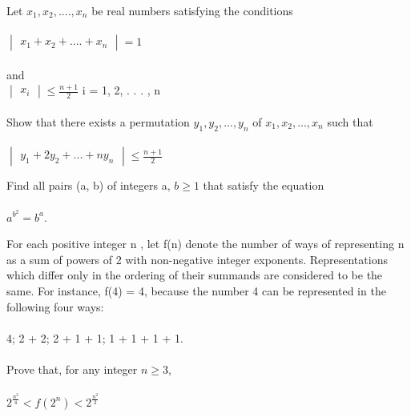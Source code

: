 \item Let $x_1, x_2, .... , x_n$ be real numbers satisfying the conditions\\
\\ $\begin{vmatrix} x_1 + x_2 + .... + x_n \end{vmatrix} = 1$\\
\\ and\\
$\begin{vmatrix}x_i \end{vmatrix} \leq \frac{n+1}{2}$  i = 1, 2, . . . , n\\
\\ Show that there exists a permutation $y_1, y_2, . . . , y_n$ of $x_1, x_2, . . . , x_n$ such that\\
\\ $\begin{vmatrix}y_1+2y_2+...+ny_n \end{vmatrix} \leq \frac{n+1}{2}$\\

\item Find all pairs (a, b) of integers a, $b \geq 1$ that satisfy the equation\\
\\ $a^{b^{2}} = b^a$.\\

\item For each positive integer n , let f(n) denote the number of ways of representing n as a sum of powers of 2 with non-negative integer exponents. Representations which differ only in the ordering of their summands are considered to be the same. For instance, f(4) = 4, because the number 4 can be represented in the
following four ways:\\
\\ 4; 2 + 2; 2 + 1 + 1; 1 + 1 + 1 + 1.\\
\\ Prove that, for any integer $n \geq 3$,\\
\\ $2^\frac{n^2}{4} < f(2^n) < 2^\frac{n^2}{2}$







